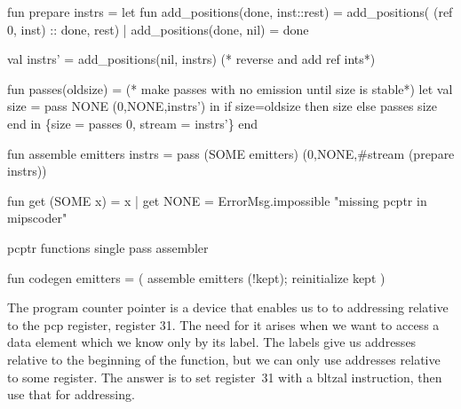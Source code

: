 \enddocs
{}
\endmoddef
fun prepare instrs =
 let fun add_positions(done, inst::rest) =  
                 add_positions( (ref 0, inst) :: done, rest)
       | add_positions(done, nil) = done

     val instrs' = add_positions(nil, instrs) (* reverse and add \code{}ref int\edoc{}s*)

     fun passes(oldsize) = 
                (* make passes with no emission until size is stable*)
        let val size = pass NONE (0,NONE,instrs')
        in  if size=oldsize then size
            else passes size
        end
  in \{size = passes 0, stream = instrs'\}
  end

fun assemble emitters instrs =
        pass (SOME emitters) (0,NONE,#stream (prepare instrs))

\endcode
{}
\endmoddef
fun get (SOME x) = x 
  | get NONE = ErrorMsg.impossible "missing pcptr in mipscoder"

\LA{}\code{}pcptr\edoc{} functions\RA{}
\LA{}single pass\RA{}
\LA{}assembler\RA{}

fun codegen emitters = (
    assemble emitters (!kept);
    \LA{}reinitialize \code{}kept\edoc{}\RA{}
    )
\endcode
{}

The program counter pointer is a device that enables us to to addressing
relative to the pcp register, register 31.
The need for it arises when we want to access a data element which we know
only by its label.
The labels give us addresses relative to the beginning of the function,
but we can only use addresses relative to some register.
The answer is to set register~31 with a \code{}bltzal\edoc{} instruction,
then use that for addressing.

